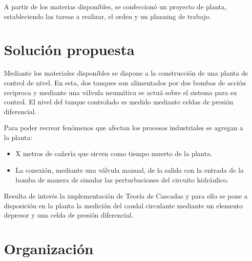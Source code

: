 A partir de los materias disponibles, se confeccionó 
un proyecto de planta, estableciendo las tareas a realizar, el orden
y un planning de trabajo.

\section{Solución propuesta}
\label{sec:SolucionPropuesta}

Mediante los materiales disponibles se dispone a la construcción de 
una planta de control de nivel. En esta, dos tanques son alimentados por 
dos bombas de acción reciproca y mediante una válvula neumática se actuá
sobre el sistema para su control. El nivel del tanque controlado es medido 
mediante celdas de presión diferencial.

Para poder recrear fenómenos que afectan los procesos industriales se agregan
a la planta:
\begin{itemize}
\item X metros de cañería que sirven como tiempo muerto
de la planta.
\item La conexión, mediante una válvula manual, de la salida con la entrada
 de la bomba de manera de simular las perturbaciones del circuito hidráulico.
\end{itemize}

Resulta de interés la implementación de Teoría de Cascadas y para ello se pone
a disposición en la planta la medición del caudal circulante mediante un elemento
depresor y una celda de presión diferencial.

\section{Organización}
\label{sec:Organizacion}
